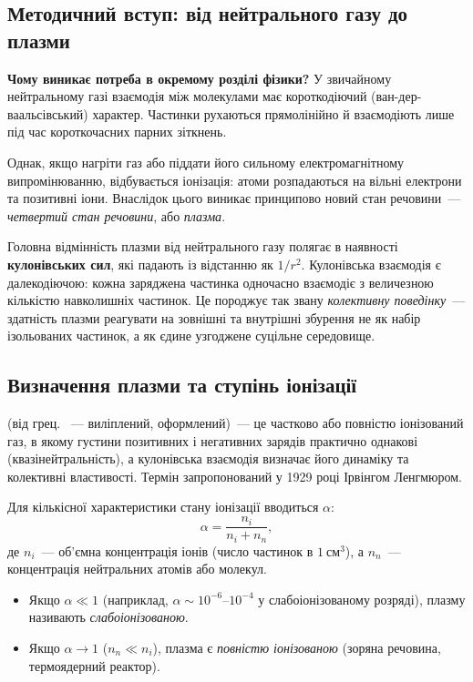 \subsection{Методичний вступ: від нейтрального газу до плазми}

\textbf{Чому виникає потреба в окремому розділі фізики?}
У звичайному нейтральному газі взаємодія між молекулами має короткодіючий (ван-дер-ваальсівський) характер. Частинки рухаються прямолінійно й взаємодіють лише під час короткочасних парних зіткнень.

Однак, якщо нагріти газ або піддати його сильному електромагнітному випромінюванню, відбувається іонізація: атоми розпадаються на вільні електрони та позитивні іони. Внаслідок цього виникає принципово новий стан речовини~--- \emph{четвертий стан речовини}, або \emph{плазма}.

Головна відмінність плазми від нейтрального газу полягає в наявності \textbf{кулонівських сил}, які падають із відстанню як $1/r^2$. Кулонівська взаємодія є далекодіючою: кожна заряджена частинка одночасно взаємодіє з величезною кількістю навколишніх частинок. Це породжує так звану \emph{колективну поведінку}~--- здатність плазми реагувати на зовнішні та внутрішні збурення не як набір ізольованих частинок, а як єдине узгоджене суцільне середовище.

\subsection{Визначення плазми та ступінь іонізації}

 (від грец. ~--- виліплений, оформлений)~--- це частково або повністю іонізований газ, в якому густини позитивних і негативних зарядів практично однакові (квазінейтральність), а кулонівська взаємодія визначає його динаміку та колективні властивості. Термін запропонований у 1929 році Ірвінгом Ленгмюром.

Для кількісної характеристики стану іонізації вводиться  $\alpha$:
\begin{equation}
	\alpha = \frac{n_i}{n_i + n_n},
\end{equation}
де $n_i$~--- об'ємна концентрація іонів (число частинок в $1~\mathrm{см}^3$), а $n_n$~--- концентрація нейтральних атомів або молекул.
\begin{itemize}
	\item Якщо $\alpha \ll 1$ (наприклад, $\alpha \sim 10^{-6}$--$10^{-4}$ у слабоіонізованому розряді), плазму називають \emph{слабоіонізованою}.
	\item Якщо $\alpha \to 1$ ($n_n \ll n_i$), плазма є \emph{повністю іонізованою} (зоряна речовина, термоядерний реактор).
\end{itemize}

